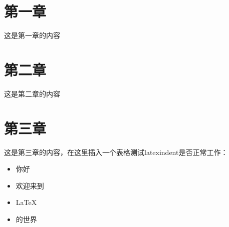 \documentclass{ctexart}
\begin{document}
\section{第一章}
这是第一章的内容
\section{第二章}
这是第二章的内容
\section{第三章}
这是第三章的内容，在这里插入一个表格测试latexindent是否正常工作：
\begin{itemize}
    \item 你好
    \item 欢迎来到
    \item \LaTeX
    \item 的世界
\end{itemize}
\end{document}
